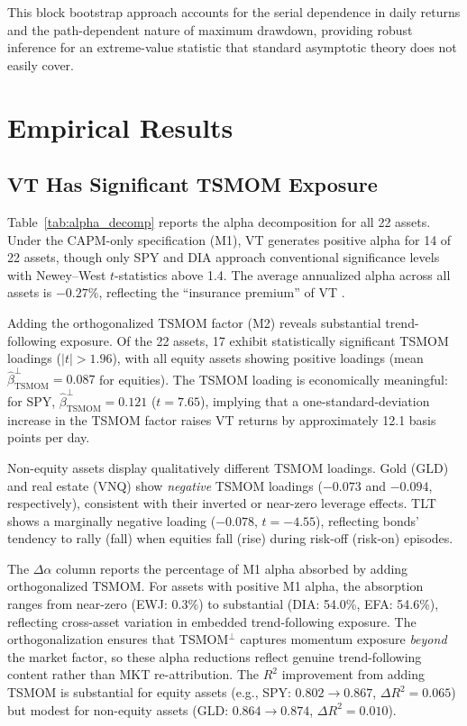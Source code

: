 This block bootstrap approach accounts for the serial dependence in daily returns and the path-dependent nature of maximum drawdown, providing robust inference for an extreme-value statistic that standard asymptotic theory does not easily cover.


\section{Empirical Results}

\subsection{VT Has Significant TSMOM Exposure}

Table~\ref{tab:alpha_decomp} reports the alpha decomposition for all 22 assets. Under the CAPM-only specification (M1), VT generates positive alpha for 14 of 22 assets, though only SPY and DIA approach conventional significance levels with Newey--West $t$-statistics above 1.4. The average annualized alpha across all assets is $-0.27\%$, reflecting the ``insurance premium'' of VT \citep{lai2026a}.

Adding the orthogonalized TSMOM factor (M2) reveals substantial trend-following exposure. Of the 22 assets, 17 exhibit statistically significant TSMOM loadings ($|t| > 1.96$), with all equity assets showing positive loadings (mean $\hat{\beta}_{\text{TSMOM}}^{\perp} = 0.087$ for equities). The TSMOM loading is economically meaningful: for SPY, $\hat{\beta}_{\text{TSMOM}}^{\perp} = 0.121$ ($t = 7.65$), implying that a one-standard-deviation increase in the TSMOM factor raises VT returns by approximately 12.1 basis points per day.

Non-equity assets display qualitatively different TSMOM loadings. Gold (GLD) and real estate (VNQ) show \textit{negative} TSMOM loadings ($-0.073$ and $-0.094$, respectively), consistent with their inverted or near-zero leverage effects. TLT shows a marginally negative loading ($-0.078$, $t = -4.55$), reflecting bonds' tendency to rally (fall) when equities fall (rise) during risk-off (risk-on) episodes.

The $\Delta\alpha$ column reports the percentage of M1 alpha absorbed by adding orthogonalized TSMOM. For assets with positive M1 alpha, the absorption ranges from near-zero (EWJ: 0.3\%) to substantial (DIA: 54.0\%, EFA: 54.6\%), reflecting cross-asset variation in embedded trend-following exposure. The orthogonalization ensures that TSMOM$^{\perp}$ captures momentum exposure \textit{beyond} the market factor, so these alpha reductions reflect genuine trend-following content rather than MKT re-attribution. The $R^2$ improvement from adding TSMOM is substantial for equity assets (e.g., SPY: $0.802 \to 0.867$, $\Delta R^2 = 0.065$) but modest for non-equity assets (GLD: $0.864 \to 0.874$, $\Delta R^2 = 0.010$).

